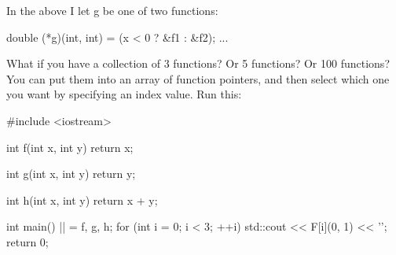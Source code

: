 




\newpage{}

In the above I let g be one of two functions:

\begin{consolethree}[escapeinside=||]
double (*g)(int, int) = (x < 0 ? &f1 : &f2);
...
\end{consolethree}

What if you have a collection of 3 functions? Or 5 functions? Or 100
functions? You can put them into an array of function pointers, and then
select which one you want by specifying an index value. Run this:

\begin{consolethree}[escapeinside=||]
#include <iostream>

int f(int x, int y)
{
    return x;
}

int g(int x, int y)
{
    return y;
}

int h(int x, int y)
{
    return x + y;
}

int main()
{
    || = {f, g, h};
    for (int i = 0; i < 3; ++i)
    {
        std::cout << F[i](0, 1) << '\n';
    }
    return 0;
}
\end{consolethree}



